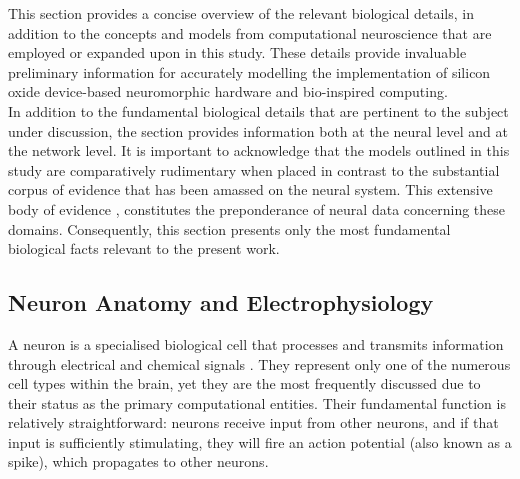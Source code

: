 

\noindent This section provides a concise overview of the relevant biological details, in addition to the concepts and models from computational neuroscience that are employed or expanded upon in this study. These details provide invaluable preliminary information for accurately modelling the implementation of silicon oxide device-based neuromorphic hardware and bio-inspired computing. \\

\noindent 
In addition to the fundamental biological details that are pertinent to the subject under discussion, the section provides information both at the neural level and at the network level. It is important to acknowledge that the models outlined in this study are comparatively rudimentary when placed in contrast to the substantial corpus of evidence that has been amassed on the neural system. This extensive body of evidence \cite{kandel2000principles}, constitutes the preponderance of neural data concerning these domains. Consequently, this section presents only the most fundamental biological facts relevant to the present work.


\subsection[Neuron Anatomy and Electrophysiology]{Neuron Anatomy and Electrophysiology}

\noindent  A neuron is a specialised biological cell that processes and transmits information through electrical and chemical signals \cite{mel1994information}. They represent only one of the numerous cell types within the brain, yet they are the most frequently discussed due to their status as the primary computational entities. Their fundamental function is relatively straightforward: neurons receive input from other neurons, and if that input is sufficiently stimulating, they will fire an action potential (also known as a spike), which propagates to other neurons.\\

